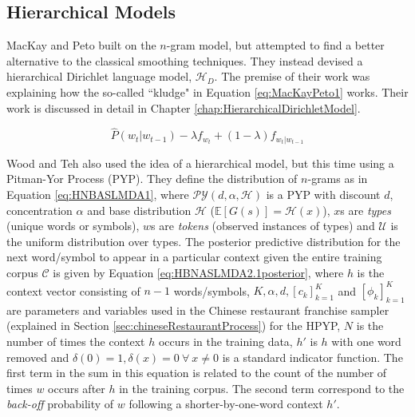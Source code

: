 
\subsection{Hierarchical Models}

MacKay and Peto \cite{mackay1995hierarchical} built on the $n$-gram model, but attempted to find a better alternative to the classical smoothing techniques. They instead devised a hierarchical Dirichlet language model, $\mathscr{H}_{D}$. The premise of their work was explaining how the so-called ``kludge" in Equation \ref{eq:MacKayPeto1} works. Their work is discussed in detail in Chapter \ref{chap:HierarchicalDirichletModel}.



\begin{equation}
\hat{P}(w_{t}|w_{t-1})-\lambda f_{w_{t}}+(1-\lambda)f_{w_{t}|w_{t-1}}
\label{eq:MacKayPeto1}
\end{equation}




Wood and Teh \cite{wood2008hierarchical} \cite{wood2009hierarchical} also used the idea of a hierarchical model, but this time using a Pitman-Yor Process (PYP). They define the distribution of $n$-grams as in Equation \ref{eq:HNBASLMDA1}, where $\mathcal{PY}(d,\alpha,\mathcal{H})$ is a PYP with discount $d$, concentration $\alpha$ and base distribution $\mathcal{H}$ ($\mathbb{E}[G(s)]=\mathcal{H}(x)$), $x$s are \textit{types} (unique words or symbols), $w$s are \textit{tokens} (observed instances of types) and $\mathcal{U}$ is the uniform distribution over types. The posterior predictive distribution for the next word/symbol to appear in a particular context given the entire training corpus $\mathcal{C}$ is given by Equation \ref{eq:HBNASLMDA2.1posterior}, where $h$ is the context vector consisting of $n-1$ words/symbols, $K,\alpha,d,[c_{k}]_{k=1}^{K}$ and $[\phi_{k}]_{k=1}^{K}$ are parameters and variables used in the Chinese restaurant franchise sampler (explained in Section \ref{sec:chineseRestaurantProcess}) for the HPYP, $N$ is the number of times the context $h$ occurs in the training data, $h'$ is $h$ with one word removed and $\delta(0)=1,\delta(x)=0\ \forall\ x\neq0$ is a standard indicator function. The first term in the sum in this equation is related to the count of the number of times $w$ occurs after $h$ in the training corpus. The second term correspond to the \textit{back-off} probability of $w$ following a shorter-by-one-word context $h'$.

